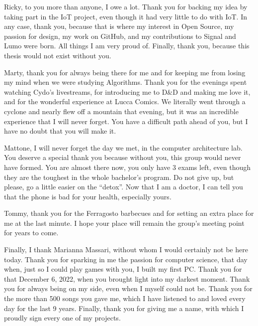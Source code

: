 Ricky, to you more than anyone, I owe a lot.
Thank you for backing my idea by taking part in the IoT project, even though it had very little to do with IoT.
In any case, thank you, because that is where my interest in Open Source, my passion for design, my work on 
GitHub, and my contributions to Signal and Lumo were born. All things I am very proud of. 
Finally, thank you, because this thesis would not exist without you.

Marty, thank you for always being there for me and for keeping me from losing my mind when we were studying Algorithms.
Thank you for the evenings spent watching Cydo's livestreams, for introducing me to D\&D and making me love it, and for the wonderful experience at 
Lucca Comics. We literally went through a cyclone and nearly flew off a mountain that evening, but it was an incredible 
experience that I will never forget. 
You have a difficult path ahead of you, but I have no doubt that you will make it.

Mattone, I will never forget the day we met, in the computer architecture lab. You deserve a special thank you 
because without you, this group would never have formed. 
You are almost there now, you only have 3 exams left, even though they are the toughest in the whole bachelor's program.
Do not give up, but please, go a little easier on the ``detox''. 
Now that I am a doctor, I can tell you that the phone is bad for your health, especially yours.

Tommy, thank you for the Ferragosto barbecues and for setting an extra place for me at the last minute. 
I hope your place will remain the group's meeting point for years to come.

\clearpage

Finally, I thank Marianna Massari, without whom I would certainly not be here today.
Thank you for sparking in me the passion for computer science, that day when, just so I could play games with you, 
I built my first PC.
Thank you for that December 6, 2022, when you brought light into my darkest moment.
Thank you for always being on my side, even when I myself could not be.
Thank you for the more than 500 songs you gave me, which I have listened to and loved every day for the last 9 years.
Finally, thank you for giving me a name, with which I proudly sign every one of my projects.
